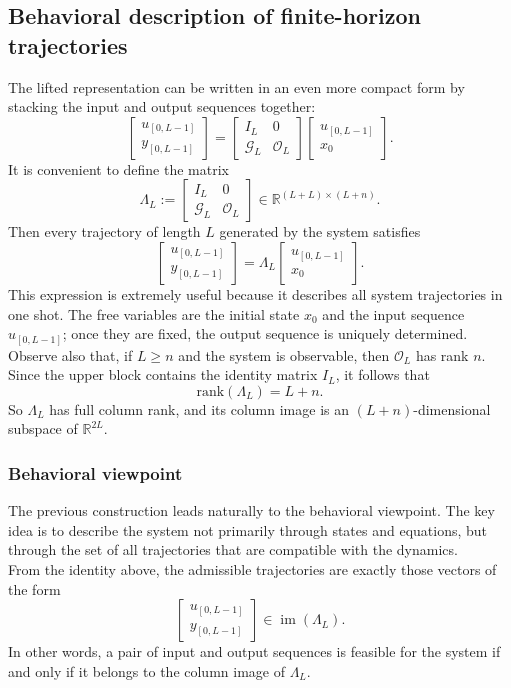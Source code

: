 \subsection{Behavioral description of finite-horizon trajectories}

The lifted representation can be written in an even more compact form by stacking the input and output sequences together:
\[
\begin{bmatrix}
u_{[0,L-1]}\\[1mm]
y_{[0,L-1]}
\end{bmatrix}
=
\begin{bmatrix}
I_L & 0\\
\mathcal{G}_L & \mathcal{O}_L
\end{bmatrix}
\begin{bmatrix}
u_{[0,L-1]}\\[1mm]
x_0
\end{bmatrix}.
\]
It is convenient to define the matrix
\[
\Lambda_L :=
\begin{bmatrix}
I_L & 0\\
\mathcal{G}_L & \mathcal{O}_L
\end{bmatrix}
\in \mathbb{R}^{(L+L)\times (L+n)}.
\]
Then every trajectory of length $L$ generated by the system satisfies
\[
\begin{bmatrix}
u_{[0,L-1]}\\[1mm]
y_{[0,L-1]}
\end{bmatrix}
=
\Lambda_L
\begin{bmatrix}
u_{[0,L-1]}\\[1mm]
x_0
\end{bmatrix}.
\]
This expression is extremely useful because it describes all system trajectories in one shot. The free variables are the initial state $x_0$ and the input sequence $u_{[0,L-1]}$; once they are fixed, the output sequence is uniquely determined.\\
Observe also that, if $L\ge n$ and the system is observable, then $\mathcal{O}_L$ has rank $n$. Since the upper block contains the identity matrix $I_L$, it follows that
\[
\text{rank}(\Lambda_L)=L+n.
\]
So $\Lambda_L$ has full column rank, and its column image is an $(L+n)$-dimensional subspace of $\mathbb{R}^{2L}$.\\
\subsubsection{Behavioral viewpoint}
The previous construction leads naturally to the behavioral viewpoint. The key idea is to describe the system not primarily through states and equations, but through the set of all trajectories that are compatible with the dynamics.\\
From the identity above, the admissible trajectories are exactly those vectors of the form
\[
\begin{bmatrix}
u_{[0,L-1]}\\[1mm]
y_{[0,L-1]}
\end{bmatrix}
\in \operatorname{im}(\Lambda_L).
\]
In other words, a pair of input and output sequences is feasible for the system if and only if it belongs to the column image of $\Lambda_L$.\\

